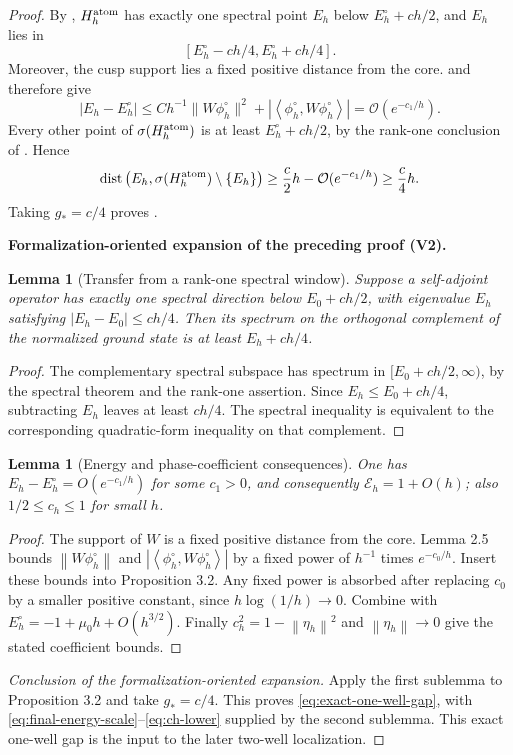 \documentclass[11pt]{article}
\newtheorem{lemma}[theorem]{Lemma}
\newcommand{\formalisationparentid}{X}
\newenvironment{formalisationaddition}[1]{\par\medskip\begingroup\color{blue}\def\formalisationparentid{#1}\setcounter{formalizationsublemma}{0}\let\lemma\formalizationsublemma\let\endlemma\endformalizationsublemma
  \def\Eo{\mathcal E_h^\circ}\def\EE{\mathcal E_h}\def\phio{\phi_h^\circ}\def\phih{\phi_h}\def\Ho{H_h^{\rm atom}(v^\circ)}\def\Ha{H_h^{\rm atom}}\def\HL{H_h^{L}}\def\Dh{D_h}\def\Log{\operatorname{Log}}\def\ellh{\ell_h}\def\Gp{G_{p,h}}\def\Ast{A_{*,h}}\def\ahat{\widehat{\mathfrak a}_h}\def\ah{\mathfrak a_h}\def\rh{\widehat\rho_h}\def\deltah{\widehat\delta_h}\def\oldref##1{\textup{(##1)}}\def\interface##1{\par\noindent\textit{Analytical interface used here.} ##1\par}\def\finish{\par\noindent\textit{Conclusion of the formalization-oriented expansion.} }\par\noindent\textbf{Formalization-oriented expansion of the preceding proof (V2).}\par\smallskip
}{\par\endgroup\medskip
}
\newcommand{\cO}{\mathcal O}
\newcommand{\norm}[1]{\left\|#1\right\|}
\newcommand{\ip}[2]{\left\langle #1,#2\right\rangle}
\newcommand{\dist}{\operatorname{dist}}
\begin{document}
\begin{proof}
By , $H_h^{\rm atom}$ has exactly one spectral point
$E_h$ below $E_h^\circ+ch/2$, and $E_h$ lies in
\[
 [E_h^\circ-ch/4,E_h^\circ+ch/4].
\]
Moreover, the cusp support lies a fixed positive distance from the core.
 and  therefore give
\[
 |E_h-E_h^\circ|
 \le Ch^{-1}\|W\phi_h^\circ\|^2
 +|\ip{\phi_h^\circ}{W\phi_h^\circ}|
 =\cO(e^{-c_1/h}).
\]
Every other point of $\sigma(H_h^{\rm atom})$ is at least $E_h^\circ+ch/2$, by
the rank-one conclusion of .  Hence
\[
 \dist\left(E_h,\sigma(H_h^{\rm atom})\setminus\{E_h\}\right)
 \ge \frac c2h-\cO(e^{-c_1/h})
 \ge \frac c4h.
\]
Taking $g_*=c/4$ proves .

\begin{formalisationaddition}{L3.3}
\begin{lemma}[Transfer from a rank-one spectral window]\label{sublemma:L3-3-gap}
Suppose a self-adjoint operator has exactly one spectral direction below $E_0+ch/2$, with eigenvalue $E_h$ satisfying $|E_h-E_0|\le ch/4$. Then its spectrum on the orthogonal complement of the normalized ground state is at least $E_h+ch/4$.
\end{lemma}
\begin{proof}
The complementary spectral subspace has spectrum in $[E_0+ch/2,\infty)$, by the spectral theorem and the rank-one assertion. Since $E_h\le E_0+ch/4$, subtracting $E_h$ leaves at least $ch/4$. The spectral inequality is equivalent to the corresponding quadratic-form inequality on that complement.
\end{proof}

\begin{lemma}[Energy and phase-coefficient consequences]\label{sublemma:L3-3-energy-coefficient}
One has $E_h-E_h^\circ=O(e^{-c_1/h})$ for some $c_1>0$, and consequently $\mathcal E_h=1+O(h)$; also $1/2\le c_h\le1$ for small $h$.
\end{lemma}
\begin{proof}
The support of $W$ is a fixed positive distance from the core. Lemma 2.5 bounds $\norm{W\phio}$ and $|\ip{\phio}{W\phio}|$ by a fixed power of $h^{-1}$ times $e^{-c_0/h}$. Insert these bounds into Proposition 3.2. Any fixed power is absorbed after replacing $c_0$ by a smaller positive constant, since $h\log(1/h)\to0$. Combine with $E_h^\circ=-1+\mu_0h+O(h^{3/2})$. Finally $c_h^2=1-\norm{\eta_h}^2$ and $\norm{\eta_h}\to0$ give the stated coefficient bounds.
\end{proof}
\finish Apply the first sublemma to Proposition 3.2 and take $g_*=c/4$. This proves \eqref{eq:exact-one-well-gap}, with \eqref{eq:final-energy-scale}--\eqref{eq:ch-lower} supplied by the second sublemma. This exact one-well gap is the input to the later two-well localization.
\end{formalisationaddition}

\end{proof}
\end{document}
